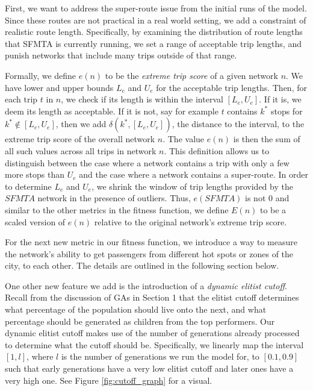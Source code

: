 \documentclass[11pt]{amsart}
\theoremstyle{definition}                  %
\theoremstyle{remark}                       %
\numberwithin{equation}{section}
\begin{document}
First, we want to address the super-route issue from the initial runs of the model. Since these routes are not practical in a real world setting, we add a constraint of realistic route length. Specifically, by examining the distribution of route lengths that SFMTA is currently running, we set a range of acceptable trip lengths, and punish networks that include many trips outside of that range. 

Formally, we define $e(n)$ to be the \textit{extreme trip score} of a given network $n$. We have lower and upper bounds $L_e$ and $U_e$ for the acceptable trip lengths. Then, for each trip $t$ in $n$, we check if its length is within the interval $[L_e, U_e]$. If it is, we deem its length as acceptable. If it is not, say for example $t$ contains $k^{*}$ stops for $k^{*} \notin [L_e, U_e]$, then we add $\delta(k^*, [L_e, U_e])$, the distance to the interval, to the extreme trip score of the overall network $n$. The value $e(n)$ is then the sum of all such values across all trips in network $n$. This definition allows us to distinguish between the case where a network contains a trip with only a few more stops than $U_e$ and the case where a network contains a super-route. In order to determine $L_e$ and $U_e$, we shrink the window of trip lengths provided by the $SFMTA$ network in the presence of outliers. Thus, $e(SFMTA)$ is not 0 and similar to the other metrics in the fitness function, we define $E(n)$ to be a scaled version of $e(n)$ relative to the original network's extreme trip score. 

For the next new metric in our fitness function, we introduce a way to measure the network's ability to get passengers from different hot spots or zones of the city, to each other. The details are outlined in the following section below. 

One other new feature we add is the introduction of a \textit{dynamic elitist cutoff}. Recall from the discussion of GAs in Section 1 that the elitist cutoff determines what percentage of the population should live onto the next, and what percentage should be generated as children from the top performers. Our dynamic elitist cutoff makes use of the number of generations already processed to determine what the cutoff should be. Specifically, we linearly map the interval $[1, l]$, where $l$ is the number of generations we run the model for, to $[0.1, 0.9]$ such that early generations have a very low elitist cutoff and later ones have a very high one. See Figure \ref{fig:cutoff_graph} for a visual. 
\end{document}
